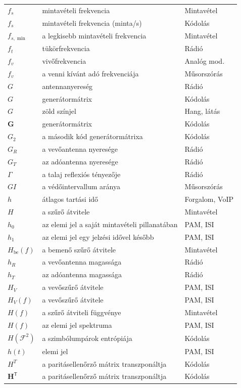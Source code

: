 {\begin{longtable}{@{}>{\raggedright\arraybackslash}p{2.4cm}>{\raggedright\arraybackslash}p{8.2cm}>{\raggedright\arraybackslash}p{3.8cm}@{}}
$f_s$ & mintavételi frekvencia & Mintavétel\\
$f_s$ & mintavételi frekvencia (minta/s) & Kódolás\\
$f_{s,\min}$ & a legkisebb mintavételi frekvencia & Mintavétel\\
$f_t$ & tükörfrekvencia & Rádió\\
$f_v$ & vivőfrekvencia & Analóg mod.\\
$f_v$ & a venni kívánt adó frekvenciája & Műsorszórás\\
$G$ & antennanyereség & Rádió\\
$G$ & generátormátrix & Kódolás\\
$G$ & zöld színjel & Hang, látás\\
$\mathbf G$ & generátormátrix & Kódolás\\
$G_2$ & a második kód generátormátrixa & Kódolás\\
$G_R$ & a vevőantenna nyeresége & Rádió\\
$G_T$ & az adóantenna nyeresége & Rádió\\
$\Gamma$ & a talaj reflexiós tényezője & Rádió\\
$GI$ & a védőintervallum aránya & Műsorszórás\\
$h$ & átlagos tartási idő & Forgalom, VoIP\\
$H$ & a szűrő átvitele & Mintavétel\\
$h_0$ & az elemi jel a saját mintavételi pillanatában & PAM, ISI\\
$h_1$ & az elemi jel egy jelzési idővel később & PAM, ISI\\
$H_\text{be}(f)$ & a bemenő szűrő átvitele & Mintavétel\\
$h_R$ & a vevőantenna magassága & Rádió\\
$h_T$ & az adóantenna magassága & Rádió\\
$H_V$ & a vevőszűrő átvitele & PAM, ISI\\
$H_V(f)$ & a vevőszűrő átvitele & PAM, ISI\\
$H(f)$ & a szűrő átviteli függvénye & Mintavétel\\
$H(f)$ & az elemi jel spektruma & PAM, ISI\\
$H(\mathcal F^2)$ & a szimbólumpárok entrópiája & Kódolás\\
$h(t)$ & elemi jel & PAM, ISI\\
$H^T$ & a paritásellenőrző mátrix transzponáltja & Kódolás\\
$\mathbf H^{\mathsf T}$ & a paritásellenőrző mátrix transzponáltja & Kódolás\\

\end{longtable}}

